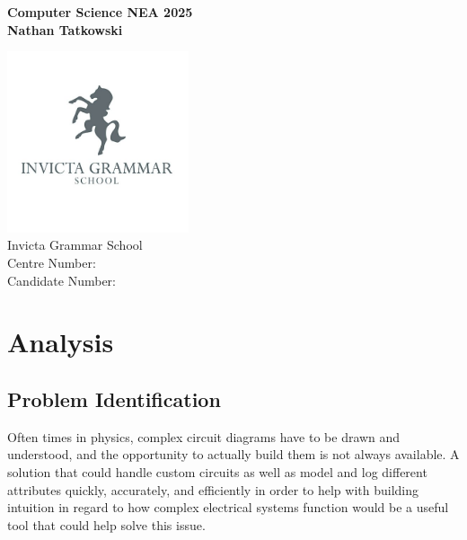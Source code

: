 \documentclass[11pt]{article}
\begin{document}
    \pagestyle{fancy}
    \setlength{\headheight}{13.6pt}

    \begin{titlepage}
        \begin{center}
            \vspace*{1cm}
            \Huge
            \textbf{Computer Science NEA 2025} \\
            \vspace*{2cm}
            \LARGE
            \textbf{Nathan Tatkowski}

            \vfill
            \includegraphics*[width=0.4\textwidth]{figures/igsLogo.jpg} \\
            \Large
            Invicta Grammar School \\
            Centre Number: \\
            Candidate Number: 
        \end{center}
    \end{titlepage}

    \tableofcontents
    \pagebreak


    \section{Analysis}
        \subsection{Problem Identification}
            Often times in physics, complex circuit diagrams have to be drawn and understood, and the opportunity to actually build them is not always available. A solution that could handle custom circuits as well as model and log different attributes quickly, accurately, and efficiently in order to help with building intuition in regard to how complex electrical systems function would be a useful tool that could help solve this issue.
\end{document}
